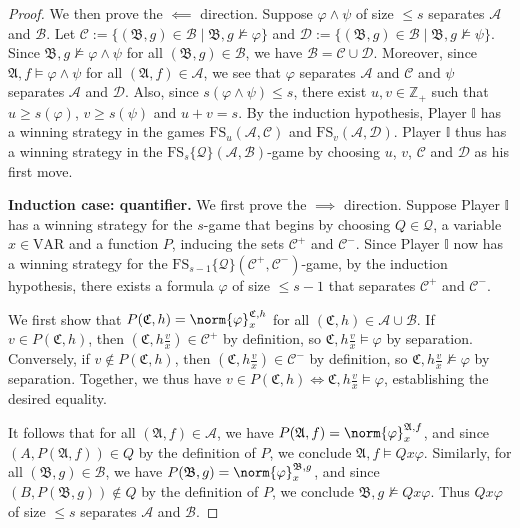 \documentclass{article}
\theoremstyle{definition}
\begin{document}
\begin{proof}
    We then prove the $\impliedby$ direction. Suppose $\varphi\land\psi$ of size $\leq s$ separates $\mathcal{A}$ and $\mathcal{B}$. Let $\mathcal{C}:=\{(\mathfrak{B},g)\in \mathcal{B}\mid \mathfrak{B},g\not\models \varphi\}$ and $\mathcal{D}:=\{(\mathfrak{B},g)\in \mathcal{B}\mid \mathfrak{B},g\not\models \psi\}$. Since $\mathfrak{B},g\not\models\varphi\land\psi$ for all $(\mathfrak{B},g)\in \mathcal{B}$, we have $\mathcal{B}=\mathcal{C}\cup\mathcal{D}$. Moreover, since $\mathfrak{A},f\models \varphi\land\psi$ for all $(\mathfrak{A},f)\in\mathcal{A}$, we see that $\varphi$ separates $\mathcal{A}$ and $\mathcal{C}$ and $\psi$ separates $\mathcal{A}$ and $\mathcal{D}$. Also, since $s(\varphi\land\psi)\leq s$, there exist $u,v\in\mathbb{Z}_+$ such that $u\geq s(\varphi)$, $v\geq s(\psi)$ and $u+v=s$. By the induction hypothesis, Player $\mathbb{I}$ has a winning strategy in the games $\mathrm{FS}_u(\mathcal{A},\mathcal{C})$ and $\mathrm{FS}_v(\mathcal{A},\mathcal{D})$. Player $\mathbb{I}$ thus has a winning strategy in the $\mathrm{FS}_s\{\mathcal{Q}\}(\mathcal{A},\mathcal{B})$-game by choosing $u$, $v$, $\mathcal{C}$ and $\mathcal{D}$ as his first move.

    \textbf{Induction case: quantifier.} We first prove the $\implies$ direction. Suppose Player $\mathbb{I}$ has a winning strategy for the $s$-game that begins by choosing $Q \in \mathcal{Q}$, a variable $x\in\mathrm{VAR}$ and a function $P$, inducing the sets $\mathcal{C}^+$ and $\mathcal{C}^-$. Since Player $\mathbb{I}$ now has a winning strategy for the $\mathrm{FS}_{s-1}\{\mathcal{Q}\}(\mathcal{C}^+,\mathcal{C}^-)$-game, by the induction hypothesis, there exists a formula $\varphi$ of size $\leq s-1$ that separates $\mathcal{C}^+$ and $\mathcal{C}^-$.

    We first show that $ P(\mathfrak{C},h)=\norm{\varphi}^{\mathfrak{C},h}_x$ for all $(\mathfrak{C},h)\in \mathcal{A}\cup\mathcal{B}$. If $v \in P(\mathfrak{C},h)$, then $(\mathfrak{C},h\frac{v}{x})\in\mathcal{C}^+$ by definition, so $\mathfrak{C},h\frac{v}{x}\models \varphi$ by separation. Conversely, if $v \notin P(\mathfrak{C},h)$, then $(\mathfrak{C},h\frac{v}{x})\in\mathcal{C}^-$ by definition, so $\mathfrak{C},h\frac{v}{x}\not\models \varphi$ by separation. Together, we thus have $v\in P(\mathfrak{C},h)\iff \mathfrak{C},h\frac{v}{x}\models \varphi$, establishing the desired equality.

    It follows that for all $(\mathfrak{A},f)\in\mathcal{A}$, we have $P(\mathfrak{A},f)=\norm{\varphi}^{\mathfrak{A},f}_x$, and since $(A,P(\mathfrak{A},f))\in Q$ by the definition of $P$, we conclude $\mathfrak{A},f\models Qx\varphi$. Similarly, for all $(\mathfrak{B},g)\in\mathcal{B}$, we have $P(\mathfrak{B},g)=\norm{\varphi}^{\mathfrak{B},g}_x$, and since $(B,P(\mathfrak{B},g))\notin Q$ by the definition of $P$, we conclude $\mathfrak{B},g\not\models Qx\varphi$. Thus $Qx\varphi$ of size $\leq s$ separates $\mathcal{A}$ and $\mathcal{B}$.
    

\end{proof}
\end{document}
